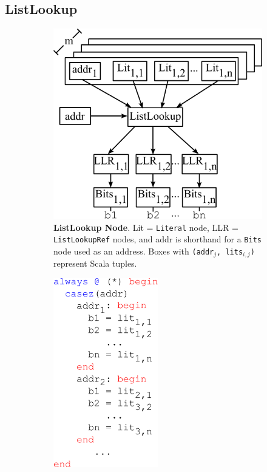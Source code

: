 \subsection{ListLookup}
\begin{figure}[htb]
\centering
  \begin{subfigure}[t]{0.48\textwidth}
  \centering
  \includegraphics[width=\textwidth]{figures/listlookupnode.pdf}
  \caption{{\bf ListLookup Node}. Lit = {\tt Literal} node, LLR =
    {\tt ListLookupRef} nodes, and addr is shorthand for a {\tt Bits} node
    used as an address. Boxes with {\tt (addr$_j$,
      lits$_{i,j}$)} represent Scala tuples.}
  \label{fig:llnode}
  \end{subfigure}
  \hfill
  \begin{subfigure}[t]{0.48\textwidth}
  \centering
  \includegraphics[width=0.5\textwidth]{figures/listlookupv.pdf}

\end{subfigure}
\end{figure}
